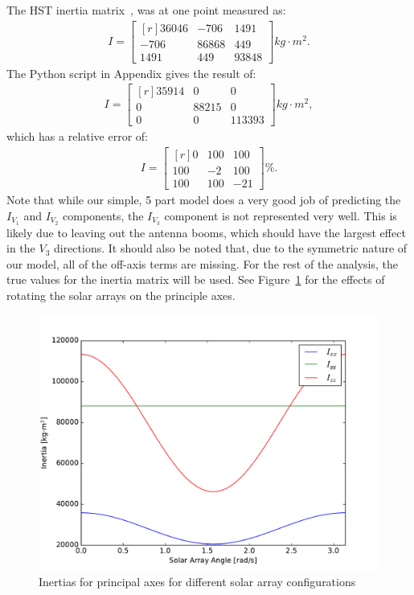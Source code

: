 \documentclass[onecolumn,10pt]{jhwhw}
\begin{document}
The HST inertia matrix~\cite{HRV}, was at one point measured as:
\begin{align*}
I =
\begin{bmatrix*}[r]
    36046       & -706  &  1491 \\
    -706        & 86868 &   449 \\
    1491        & 449   & 93848
\end{bmatrix*}
kg \cdot m^2.
\end{align*}
The Python script in Appendix gives the result of:
\begin{align*}
I =
\begin{bmatrix*}[r]
   35914 &      0 &      0 \\
       0 & 88215 &      0 \\
       0 &      0 & 113393
\end{bmatrix*}
kg \cdot m^2,
\end{align*}
which has a relative error of:
\begin{align*}
I =
\begin{bmatrix*}[r]
  0 & 100 & 100 \\
100 &  -2 & 100 \\
100 & 100 & -21
\end{bmatrix*}
\%.
\end{align*}
Note that while our simple, 5 part model does a very good job of predicting the $I_{V_1}$ and $I_{V_2}$ components, the $I_{V_3}$ component is not represented very well. This is likely due to leaving out the antenna booms, which should have the largest effect in the $V_3$ directions. It should also be noted that, due to the symmetric nature of our model, all of the off-axis terms are missing. For the rest of the analysis, the true values for the inertia matrix will be used. See Figure~\ref{fig:inert} for the effects of rotating the solar arrays on the principle axes.

\begin{figure}[h!]
\begin{center}
\includegraphics[height=0.41\textheight]{figure1.pdf}
\end{center}
\caption{Inertias for principal axes for different solar array configurations}
\label{fig:inert}
\end{figure}
\end{document}
